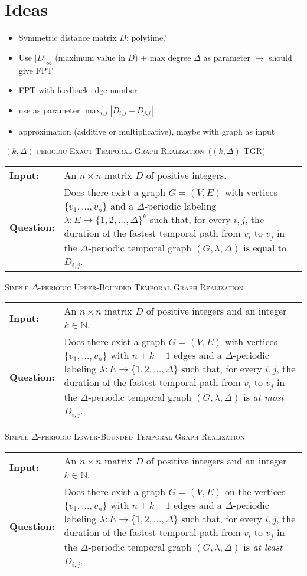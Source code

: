 \documentclass[11pt,a4paper]{article}
\makeatletter
\theoremstyle{remark}
\theoremstyle{definition}
\newcommand{\problemdef}[3]{
	\begin{center}
		\begin{minipage}{0.95\textwidth}
			\noindent
			#1
			\vspace{5pt}\\
			\setlength{\tabcolsep}{3pt}
			\begin{tabularx}{\textwidth}{@{}lX@{}}
				\textbf{Input:}& #2 \\
				\textbf{Question:}& #3
			\end{tabularx}
		\end{minipage}
	\end{center}
}
\newcommand{\kDeltaExactLong}{\textsc{$(k,\Delta)$-periodic Exact Temporal Graph Realization}}
\newcommand{\kDeltaExact}{\textsc{$(k,\Delta)$-TGR}}
\newcommand{\kDeltaUpperBoundLong}{\textsc{Simple $\Delta$-periodic Upper-Bounded Temporal Graph Realization}}
\newcommand{\kDeltaLowerBoundLong}{\textsc{Simple $\Delta$-periodic Lower-Bounded Temporal Graph Realization}}
\makeatother
\begin{document}
	


\clearpage

\appendix

\section{Ideas}
\begin{itemize}
    \item Symmetric distance matrix $D$: polytime?
    \item Use $|D|_\infty$ (maximum value in $D$) + max degree $\Delta$ as parameter $\rightarrow$ should give FPT
    \item FPT with feedback edge number
    \item use as parameter $\max_{i,j} |D_{i,j}-D_{j,i}|$
    \item approximation (additive or multiplicative), maybe with graph as input
\end{itemize}

\problemdef{\kDeltaExactLong\ (\kDeltaExact)}
{An $n \times n$ matrix $D$ of positive integers.}
{Does there exist a graph $G=(V,E)$ with vertices $\{v_1,\ldots,v_{n}\}$ 
and a $\Delta$-periodic labeling $\lambda: E \rightarrow \{1,2,\ldots,\Delta\}^k$ such that, 
for every $i,j$, the duration of the fastest temporal path from $v_i$ to $v_j$ in the $\Delta$-periodic temporal graph $(G,\lambda,\Delta)$ is equal to $D_{i,j}$.}

\problemdef{\kDeltaUpperBoundLong}
{An $n \times n$ matrix $D$ of positive integers and an integer $k\in \mathbb{N}$.}
{Does there exist a graph $G=(V,E)$ with vertices $\{v_1,\ldots,v_{n}\}$ with $n+k-1$ edges 
and a $\Delta$-periodic labeling $\lambda: E \rightarrow \{1,2,\ldots,\Delta\}$ such that, 
for every $i,j$, the duration of the fastest temporal path from $v_i$ to $v_j$ in the $\Delta$-periodic temporal graph $(G,\lambda,\Delta)$ is \emph{at most} $D_{i,j}$.}

\problemdef{\kDeltaLowerBoundLong}
{An $n \times n$ matrix $D$ of positive integers and an integer $k\in \mathbb{N}$.}
{Does there exist a graph $G=(V,E)$ on the vertices $\{v_1,\ldots,v_{n}\}$ with $n+k-1$ edges 
and a $\Delta$-periodic labeling $\lambda: E \rightarrow \{1,2,\ldots,\Delta\}$ such that, 
for every $i,j$, the duration of the fastest temporal path from $v_i$ to $v_j$ in the $\Delta$-periodic temporal graph $(G,\lambda,\Delta)$ is \emph{at least} $D_{i,j}$.}

\end{document}
